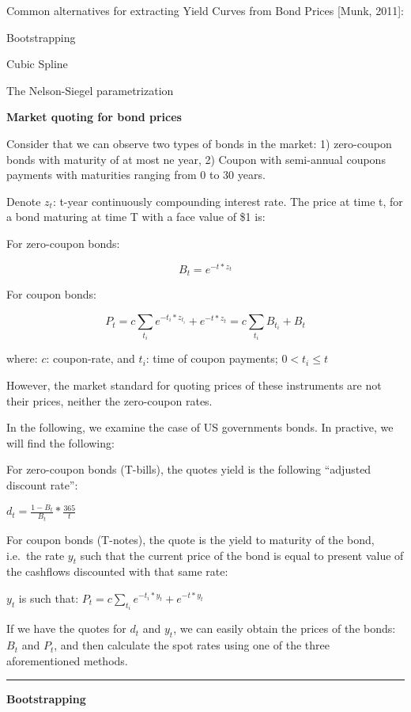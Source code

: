 \documentclass[letterpaper,10pt,english]{/anaconda/lib/python2.7/site-packages/sphinx/texinputs/sphinxhowto}
\begin{document}
Common alternatives for extracting Yield Curves from Bond Prices
{[}Munk, 2011{]}:

Bootstrapping

Cubic Spline

The Nelson-Siegel parametrization

\textbf{Market quoting for bond prices}

Consider that we can observe two types of bonds in the market: 1)
zero-coupon bonds with maturity of at most ne year, 2) Coupon with
semi-annual coupons payments with maturities ranging from 0 to 30 years.

Denote $z_t$: t-year continuously compounding interest rate. The price
at time t, for a bond maturing at time T with a face value of \$1 is:

For zero-coupon bonds:

\[ B_t = e^{-t * z_t}\]

For coupon bonds:

\[ P_t = c \sum\limits_{t_i} e^{-t_i * z_{t_i}} + e^{-t * z_t} = c \sum\limits_{t_i} B_{t_i} + B_{t} \]

where: $c$: coupon-rate, and $t_i$: time of coupon payments;
$0 < t_i \leq t$

However, the market standard for quoting prices of these instruments are
not their prices, neither the zero-coupon rates.

In the following, we examine the case of US governments bonds. In
practive, we will find the following:

For zero-coupon bonds (T-bills), the quotes yield is the following
``adjusted discount rate'':

$d_t = \frac{1-B_t}{B_t}*\frac{365}{t}$

For coupon bonds (T-notes), the quote is the yield to maturity of the
bond, i.e.~the rate $y_t$ such that the current price of the bond is
equal to present value of the cashflows discounted with that same rate:

$y_t$ is such that:
$P_t = c \sum\limits_{t_i} e^{-t_i * y_t} + e^{-t * y_t}$

If we have the quotes for $d_t$ and $y_t$, we can easily obtain the
prices of the bonds: $B_t$ and $P_t$, and then calculate the spot rates
using one of the three aforementioned methods.

\begin{center}\rule{3in}{0.4pt}\end{center}

\textbf{Bootstrapping}
\end{document}
